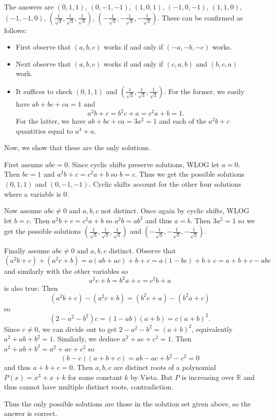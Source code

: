 The answers are $(0,1,1)$, $(0,-1,-1)$, $(1,0,1)$, $(-1,0,-1)$, $(1,1,0)$, $(-1,-1,0)$, $(\frac{1}{\sqrt{3}},\frac{1}{\sqrt{3}},\frac{1}{\sqrt{3}})$, $(-\frac{1}{\sqrt{3}},-\frac{1}{\sqrt{3}},-\frac{1}{\sqrt{3}})$. These can be confirmed as follows:
\begin{itemize}
	\item First observe that $(a,b,c)$ works if and only if $(-a,-b,-c)$ works.
	\item Next observe that $(a,b,c)$ works if and only if $(c,a,b)$ and $(b,c,a)$ work.
	\item It suffices to check $(0,1,1)$ and $(\frac{1}{\sqrt{3}},\frac{1}{\sqrt{3}},\frac{1}{\sqrt{3}})$. For the former, we easily have $ab+bc+ca=1$ and \[a^2b+c=b^2c+a=c^2a+b=1.\] For the latter, we have $ab+bc+ca=3a^2=1$ and each of the $a^2b+c$ quantities equal to $a^3+a$.
\end{itemize}

Now, we show that these are the only solutions.

First assume $abc=0$. Since cyclic shifts preserve solutions, WLOG let $a=0$. Then $bc=1$ and $a^2b+c=c^2a+b$ so $b=c$. Thus we get the possible solutions $(0,1,1)$ and $(0,-1,-1)$. Cyclic shifts account for the other four solutions where a variable is $0$.

Now assume $abc\neq0$ and $a,b,c$ not distinct. Once again by cyclic shifts, WLOG let $b=c$. Then $a^2b+c=c^2a+b$ so $a^2b=ab^2$ and thus $a=b$. Then $3a^2=1$ so we get the possible solutions $(\frac{1}{\sqrt{3}},\frac{1}{\sqrt{3}},\frac{1}{\sqrt{3}})$ and $(-\frac{1}{\sqrt{3}},-\frac{1}{\sqrt{3}},-\frac{1}{\sqrt{3}})$.

Finally assume $abc\neq0$ and $a,b,c$ distinct. Observe that \[(a^2b+c)+(a^2c+b)=a(ab+ac)+b+c=a(1-bc)+b+c=a+b+c-abc\] and similarly with the other variables so \[a^2c+b=b^2a+c=c^2b+a\] is also true. Then \[(a^2b+c)-(a^2c+b)=(b^2c+a)-(b^2a+c)\] so \[(2-a^2-b^2)c=(1-ab)(a+b)=c(a+b)^2.\] Since $c\neq0$, we can divide out to get $2-a^2-b^2=(a+b)^2$, equivalently $a^2+ab+b^2=1$. Similarly, we deduce $a^2+ac+c^2=1$. Then $a^2+ab+b^2=a^2+ac+c^2$ so \[(b-c)(a+b+c)=ab-ac+b^2-c^2=0\] and thus $a+b+c=0$. Then $a,b,c$ are distinct roots of a polynomial $P(x)=x^3+x+k$ for some constant $k$ by Vieta. But $P$ is increasing over $\mathbb{R}$ and thus cannot have multiple distinct roots, contradiction.

Thus the only possible solutions are those in the solution set given above, so the answer is correct.